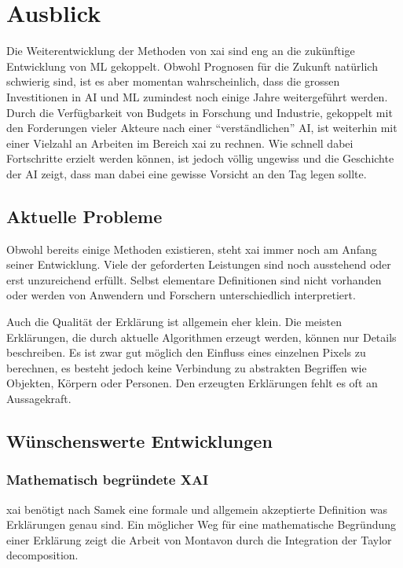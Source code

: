 \documentclass[
  12pt, %
  a4paper, %
  oneside, %
  openany, 
  numbers=noenddot, %
  BCOR=5mm, %
  parskip=half*, %
  thesis, %
]{bfhbook}
\begin{document}
\chapter{Ausblick}
Die Weiterentwicklung der Methoden von \Gls{xai} sind eng an die zukünftige Entwicklung von \Gls{ML} gekoppelt. Obwohl Prognosen für die Zukunft natürlich schwierig sind, ist es aber momentan wahrscheinlich, dass die grossen Investitionen in \Gls{AI} und \Gls{ML} zumindest noch einige Jahre weitergeführt werden. Durch die Verfügbarkeit von Budgets in Forschung und Industrie, gekoppelt mit den Forderungen vieler Akteure nach einer ``verständlichen'' \Gls{AI}, ist weiterhin mit einer Vielzahl an Arbeiten im Bereich \Gls{xai} zu rechnen. Wie schnell dabei Fortschritte erzielt werden können, ist jedoch völlig ungewiss und die Geschichte der \Gls{AI} zeigt, dass man dabei eine gewisse Vorsicht an den Tag legen sollte.

\section{Aktuelle Probleme}
Obwohl bereits einige Methoden existieren, steht \Gls{xai} immer noch am Anfang seiner Entwicklung. Viele der geforderten Leistungen  sind noch ausstehend oder erst unzureichend erfüllt. Selbst elementare Definitionen sind nicht vorhanden oder werden von Anwendern und Forschern unterschiedlich interpretiert.  

Auch die Qualität der Erklärung ist allgemein eher klein. Die meisten Erklärungen, die durch aktuelle Algorithmen erzeugt werden, können nur Details beschreiben. Es ist zwar gut möglich den Einfluss eines einzelnen Pixels zu berechnen, es besteht jedoch keine Verbindung zu abstrakten Begriffen wie Objekten, Körpern oder Personen. Den erzeugten Erklärungen fehlt es oft an Aussagekraft.

\section{Wünschenswerte Entwicklungen}

\subsection{Mathematisch begründete XAI}
\Gls{xai} benötigt nach Samek \parencite{Samek2019a} eine formale und allgemein akzeptierte Definition was Erklärungen genau sind.
Ein möglicher Weg für eine mathematische Begründung einer Erklärung zeigt die Arbeit von Montavon \parencite{Montavon2017} durch die Integration der Taylor decomposition.
\end{document}
